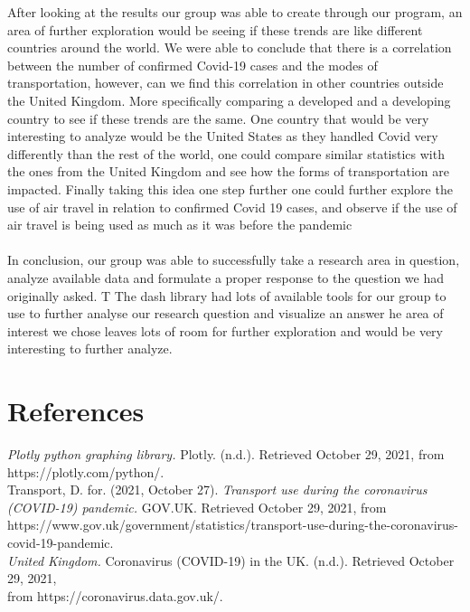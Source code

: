 \documentclass[fontsize=11pt]{article}
\begin{document}
After looking at the results our group was able to create through our program, an area of further exploration would be seeing if these trends are like different countries around the world. We were able to conclude that there is a correlation between the number of confirmed Covid-19 cases and the modes of transportation, however, can we find this correlation in other countries outside the United Kingdom. More specifically comparing a developed and a developing country to see if these trends are the same. One country that would be very interesting to analyze would be the United States as they handled Covid very differently than the rest of the world, one could compare similar statistics with the ones from the United Kingdom and see how the forms of transportation are impacted. Finally taking this idea one step further one could further explore the use of air travel in relation to confirmed Covid 19 cases, and observe if the use of air travel is being used as much as it was before the pandemic \\ \\

In conclusion, our group was able to successfully take a research area in question, analyze available data and formulate a proper response to the question we had originally asked. T The dash library had lots of available tools for our group to use to further analyse our research question and visualize an answer he area of interest we chose leaves lots of room for further exploration and would be very interesting to further analyze.


\section*{References}
\begin{hangparas}{.25in}{1}
\textit{Plotly python graphing library. } Plotly. (n.d.). Retrieved October 29, 2021, from https://plotly.com/python/. \\


Transport, D. for. (2021, October 27). \textit{Transport use during the coronavirus (COVID-19) pandemic.} GOV.UK. Retrieved October 29, 2021, from https://www.gov.uk/government/statistics/transport-use-during-the-coronavirus-covid-19-pandemic. \\


\textit{United Kingdom.} Coronavirus (COVID-19) in the UK. (n.d.). Retrieved October 29, 2021, \\ from https://coronavirus.data.gov.uk/.


\end{hangparas}
\end{document}
